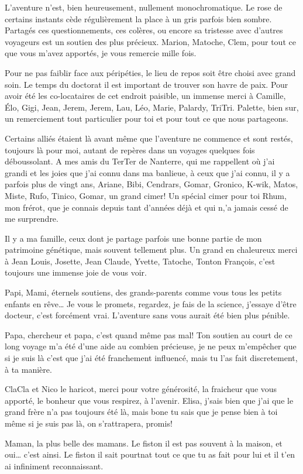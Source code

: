 L'aventure n'est, bien heureusement, nullement monochromatique. Le rose
de certains instants cède régulièrement la place à un gris parfois bien
sombre. Partagés ces questionnements, ces colères, ou encore sa
tristesse avec d'autres voyageurs est un soutien des plus précieux.
Marion, Matoche, Clem, pour tout ce que vous m'avez apportés, je vous
remercie mille fois.

Pour ne pas faiblir face aux péripéties, le lieu de repos soit être
choisi avec grand soin. Le temps du doctorat il est important de trouver
son havre de paix. Pour avoir été les co-locataires de cet endroit
paisible, un immense merci à Camille, Élo, Gigi, Jean, Jerem, Jerem,
Lau, Léo, Marie, Palardy, TriTri. Palette, bien sur, un remerciement
tout particulier pour toi et pour tout ce que nous partageons.

Certains alliés étaient là avant même que l'aventure ne commence et sont
restés, toujours là pour moi, autant de repères dans un voyages quelques
fois déboussolant. A mes amis du TerTer de Nanterre, qui me rappellent
où j'ai grandi et les joies que j'ai connu dans ma banlieue, à ceux que
j'ai connu, il y a parfois plus de vingt ans, Ariane, Bibi, Cendrars,
Gomar, Gronico, K-wik, Matos, Miste, Rufo, Tinico, Gomar, un grand
cimer! Un spécial cimer pour toi Rhum, mon frérot, que je connais depuis
tant d'années déjà et qui n,'a jamais cessé de me surprendre.

Il y a ma famille, ceux dont je partage parfois une bonne partie de mon
patrimoine génétique, mais souvent tellement plus. Un grand en
chaleureux merci à Jean Louis, Josette, Jean Claude, Yvette, Tatoche,
Tonton François, c'est toujours une immense joie de vous voir.

Papi, Mami, éternels soutiens, des grands-parents comme vous tous les
petits enfants en rêve\ldots{} Je vous le promets, regardez, je fais de
la science, j'essaye d'être docteur, c'est forcément vrai. L'aventure
sans vous aurait été bien plus pénible.

Papa, chercheur et papa, c'est quand même pas mal! Ton soutien au court
de ce long voyage m'a été d'une aide au combien précieuse, je ne peux
m'empêcher que si je suis là c'est que j'ai été franchement influencé,
mais tu l'as fait discretement, à ta manière.

ClaCla et Nico le haricot, merci pour votre générosité, la fraicheur que
vous apporté, le bonheur que vous respirez, à l'avenir. Elisa, j'sais
bien que j'ai que le grand frère n'a pas toujours été là, mais bone tu
sais que je pense bien à toi même si je suis pas là, on s'rattrapera,
promis!

Maman, la plus belle des mamans. Le fiston il est pas souvent à la
maison, et oui\ldots{} c'est ainsi. Le fiston il sait pourtnat tout ce
que tu as fait pour lui et il t'en ai infiniment reconnaissant.
